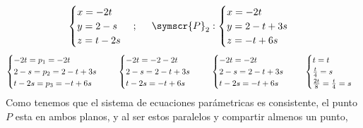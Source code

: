 \documentclass{article}
\def\fancyP{\symscr{P}}
\begin{document}
\begin{enumerate}
\begin{itemize}
\begin{itemize}
\[\begin{cases}
                            x = -2t \\
                            y = 2 - s \\
                            z = t - 2s
                        \end{cases};
                        \hspace{0.5cm}
                        \fancyP_2:
                        \begin{cases}
                            x = -2t \\
                            y = 2 -t + 3s \\
                            z = -t + 6s
                        \end{cases}
                    \]
                    \[
                        \begin{cases}
                            -2t = p_1 = -2t \\
                            2 - s = p_2 = 2 -t + 3s \\
                            t - 2s = p_3 = -t + 6s
                        \end{cases}
                        \hspace{0.5cm}
                        \begin{cases}
                            -2t = -2 -2t \\
                            2 - s = 2 -t + 3s \\
                            t - 2s = -t + 6s
                        \end{cases}
                        \hspace{0.5cm}
                        \begin{cases}
                            -2t = -2t \\
                            2 - s = 2 -t + 3s \\
                            t - 2s = -t + 6s
                        \end{cases}
                        \hspace{0.5cm}
                        \begin{cases}
                            t = t \\
                            \frac{t}{4} = s \\
                            \frac{2t}{8} = \frac{t}{4} = s
                        \end{cases}
                    \]
                    Como tenemos que el sistema de ecuaciones parámetricas es consistente, el punto \(P\) esta en ambos planos, y al ser estos paralelos y compartir almenos un punto,

\end{itemize}
\end{itemize}
\end{enumerate}
\end{document}
